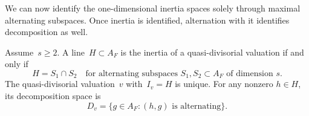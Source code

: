 We can now identify the one-dimensional inertia spaces solely through
maximal alternating subspaces.  Once inertia is identified, alternation
with it identifies decomposition as well.

\begin{proposition}
\label{prop:quasi-recovery}
Assume~\(s\geq2\).  A line~\(H\subset A_F\) is the inertia of a
quasi-divisorial valuation if and only if
\begin{equation}
 H=S_1\cap S_2
 \quad\text{for alternating subspaces }S_1,S_2\subset A_F
 \text{ of dimension }s.
 \label{eq:local-inertia-intersection}
\end{equation}
The quasi-divisorial valuation~\(v\) with~\(I_v=H\) is unique.  For any nonzero
\(h\in H\), its decomposition space is
\begin{equation}
 D_v=\{g\in A_F:(h,g)\text{ is alternating}\}.
 \label{eq:local-decomposition-recognition}
\end{equation}
\end{proposition}


